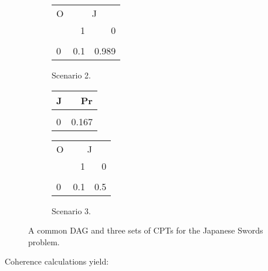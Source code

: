 \documentclass[10pt,]{scrartcl}
\begin{document}
\begin{figure}
\begin{subfigure}[!ht]{0.4\textwidth}
\begin{table}[H]
\centering
\begin{tabular}{lrr}
\toprule
\multicolumn{1}{c}{O} & \multicolumn{2}{c}{J} \\
  & 1 & 0\\
\midrule
\cellcolor{gray!6}{1} & \cellcolor{gray!6}{0.9} & \cellcolor{gray!6}{0.011}\\
0 & 0.1 & 0.989\\
\bottomrule
\end{tabular}
\end{table}
\caption{Scenario 2.}
\end{subfigure}  \hfill
\begin{subfigure}[!ht]{0.6\textwidth}
\begin{table}[H]
\centering
\begin{tabular}{lr}
\toprule
J & Pr\\
\midrule
\cellcolor{gray!6}{1} & \cellcolor{gray!6}{0.833}\\
0 & 0.167\\
\bottomrule
\end{tabular}
\end{table}

\begin{table}[H]
\centering
\begin{tabular}{lrr}
\toprule
\multicolumn{1}{c}{O} & \multicolumn{2}{c}{J} \\
  & 1 & 0\\
\midrule
\cellcolor{gray!6}{1} & \cellcolor{gray!6}{0.9} & \cellcolor{gray!6}{0.5}\\
0 & 0.1 & 0.5\\
\bottomrule
\end{tabular}
\end{table}
\caption{Scenario 3.}
\end{subfigure} 
\caption{A common DAG and three sets of CPTs for the \textsf{Japanese Swords} problem.}
\label{fig:japanese}
\end{figure}

\newpage 

Coherence calculations yield:
\end{document}
